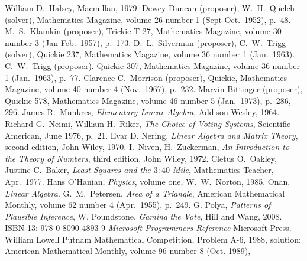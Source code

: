 \begin{thebibliography}{\makebox[2em][c]{{}\hfil{}}}
  William D.~Halsey,
  Macmillan, 1979.
  Dewey Duncan (proposer), W.\ H.\ Quelch (solver),
  Mathematics Magazine,
  volume 26 number 1 (Sept-Oct.\ 1952),
  p.~48.
  M.\ S.\ Klamkin (proposer),
  Trickie T-27,
  Mathematics Magazine,
  volume 30 number 3 (Jan-Feb.\ 1957),
  p.~173.
  D.\ L.\ Silverman (proposer), C.\ W.\ Trigg (solver),
  Quickie 237,
  Mathematics Magazine,
  volume 36 number 1 (Jan.\ 1963).
  C.\ W.\ Trigg (proposer).
  Quickie 307,
  Mathematics Magazine,
  volume 36 number 1 (Jan.\ 1963),
  p.~77.
  Clarence C.\ Morrison (proposer),
  Quickie,
  Mathematics Magazine,
  volume 40 number 4 (Nov.\ 1967),
  p.~232.
  Marvin Bittinger (proposer),
  Quickie 578,
  Mathematics Magazine,
  volume 46 number 5 (Jan.\ 1973),
  p.~286, 296.
  James R.\ Munkres,
  \emph{Elementary Linear Algebra},
  Addison-Wesley,
  1964.
  Richard G.~Neimi, William H.~Riker,
  \emph{The Choice of Voting Systems},
  Scientific American,
  June 1976,
  p.~21.
  Evar D. Nering,
  \emph{Linear Algebra and Matrix Theory},
  second edition,
  John Wiley,
  1970.
  I.\ Niven, H.\ Zuckerman,
  \emph{An Introduction to the Theory of Numbers},
  third edition,
  John Wiley,
  1972.
  Cletus O.\ Oakley, Justine C.\ Baker,
  \emph{Least Squares and the $3:40$ Mile},
  Mathematics Teacher,
  Apr.\ 1977.
  Hans O'Hanian,
  \emph{Physics},
  volume one,
  W.\ W.\ Norton,
  1985.
  Onan,
  \emph{Linear Algebra}.
  G.\ M.\ Petersen,
  \emph{Area of a Triangle},
  American Mathematical Monthly,
  volume 62 number 4 (Apr.\ 1955),
  p.~249.
  G. Polya,
  \emph{Patterns of Plausible Inference},
  W. Poundstone,
  \emph{Gaming the Vote},
  Hill and Wang, 2008.
  ISBN-13: 978-0-8090-4893-9 
  \emph{Microsoft Programmers Reference}
  Microsoft Press.
  William Lowell Putnam Mathematical Competition,
  Problem A-6, 1988,
  solution: American Mathematical Monthly, 
  volume 96 number 8 (Oct. 1989),

\end{thebibliography}
